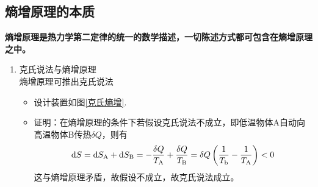 \subsection{熵增原理的本质}
\textbf{熵增原理是热力学第二定律的统一的数学描述，一切陈述方式都可包含在熵增原理之中。}
\begin{enumerate}
	\item 克氏说法与熵增原理\\
	熵增原理可推出克氏说法
	\begin{itemize}
		\item 设计装置如图\ref{克氏熵增}.
		\item 证明：在熵增原理的条件下若假设克氏说法不成立，即低温物体A自动向高温物体B传热$\delta Q$，则有
		\begin{align*}
			{\rm{d}} S = {\rm{d}} S_\text{A} + {\rm{d}} S_\text{B} = - \dfrac{\delta Q}{T_\text{A}} + \dfrac{\delta Q}{T_\text{B}} = \delta Q \left(\dfrac{1}{T_{\text{b}}} - \dfrac{1}{T_\text{A}}\right)<0
		\end{align*}
	这与熵增原理矛盾，故假设不成立，故克氏说法成立。
	\end{itemize}	


\end{enumerate}
